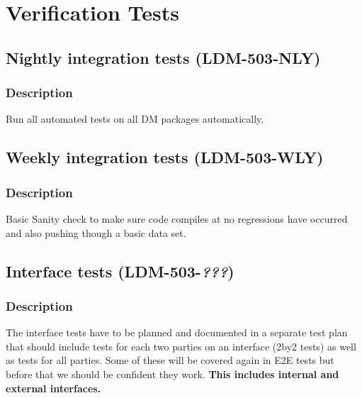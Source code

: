 















\section{Verification Tests \label{sect:vts}}

\subsection{Nightly integration tests (\textbf{LDM-503-NLY})}
\subsubsection{Description}
Run all automated tests on all DM packages automatically.

\subsection{Weekly integration tests (\textbf{LDM-503-WLY})}
\subsubsection{Description}
Basic Sanity check to make sure code compiles at no regressions have occurred
and also pushing though a basic data set.

\subsection{Interface tests (\textbf{LDM-503-\textit{???}})}
\subsubsection{Description}
The interface tests have to be planned and documented in a separate test plan that should include tests for each two parties on an interface (2by2 tests) as well as tests for all parties.
Some of these will be covered again in E2E tests but before that we should be confident they work.
\textbf{This includes internal and external interfaces.}

